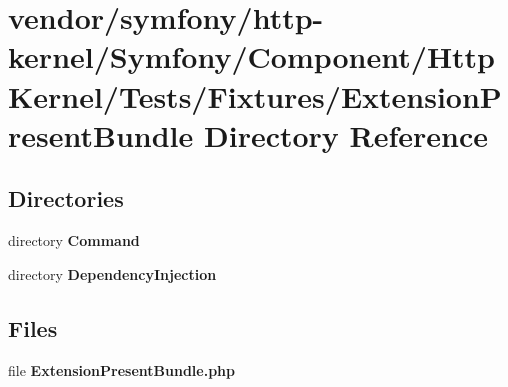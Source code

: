 \section{vendor/symfony/http-\/kernel/\+Symfony/\+Component/\+Http\+Kernel/\+Tests/\+Fixtures/\+Extension\+Present\+Bundle Directory Reference}
\label{dir_b7632337735720157088e2296a71bf1a}
\subsection*{Directories}
\begin{DoxyCompactItemize}
\item 
directory {\bf Command}
\item 
directory {\bf Dependency\+Injection}
\end{DoxyCompactItemize}
\subsection*{Files}
\begin{DoxyCompactItemize}
\item 
file {\bf Extension\+Present\+Bundle.\+php}
\end{DoxyCompactItemize}
